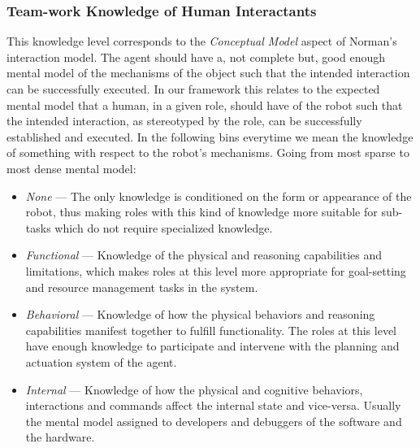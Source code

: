 \documentclass[letterpaper, 10 pt, conference]{ieeeconf} %
\theoremstyle{definition} \newtheorem{definition}{Definition}
\begin{document}
\subsubsection{Team-work Knowledge of Human Interactants}
This knowledge level corresponds to the \textit{Conceptual Model} aspect of
Norman's interaction model. The agent should have a, not complete but, good
enough mental model of the mechanisms of the object such that the intended
interaction can be successfully executed. In our framework this relates to the
expected mental model that a human, in a given role, should have of the robot
such that the intended interaction, as stereotyped by the role, can be
successfully established and executed. In the following bins everytime we mean
the knowledge of something with respect to the robot's mechanisms. Going from
most sparse to most dense mental model:
\begin{itemize}{}
  \item \textit{None} --- The only knowledge is conditioned on the form or
        appearance of the robot, thus making roles with this kind of knowledge more
        suitable for sub-tasks which do not require specialized knowledge.
  \item \textit{Functional} --- Knowledge of the physical and reasoning
        capabilities and limitations, which makes roles at this level more
        appropriate for goal-setting and resource management tasks in the system.
  \item \textit{Behavioral} --- Knowledge of how the physical behaviors and
        reasoning capabilities manifest together to fulfill functionality. The roles
        at this level have enough knowledge to participate and intervene with the
        planning and actuation system of the agent.
  \item \textit{Internal} --- Knowledge of how the physical and cognitive
        behaviors, interactions and commands affect the internal state and
        vice-versa. Usually the mental model assigned to developers and debuggers of
        the software and the hardware.
\end{itemize}
\end{document}
